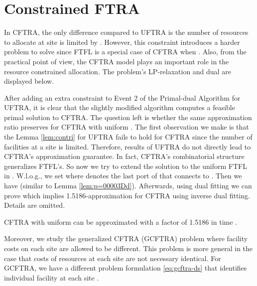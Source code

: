 \documentclass[10pt]{llncs}
\begin{document}
\section{Constrained FTRA }

In CFTRA, the only difference compared to UFTRA is the number of resources
to allocate at site  is limited by  .
However, this constraint introduces a harder problem to solve since
FTFL is a special case of CFTRA when  . Also,
from the practical point of view, the CFTRA model plays an important
role in the resource constrained allocation. The problem's LP-relaxation
and dual are displayed below.

\setlength{\columnsep}{10pt}
\begin{multicols}{2}

{\small 
}{\small \par}

{\small \columnbreak }{\small \par}

{\small 
}{\small \par}

\end{multicols}

After adding an extra constraint  to Event 2 of the
Primal-dual Algorithm for UFTRA, it is clear that the slightly modified
algorithm computes a feasible primal solution to CFTRA. The question
left is whether the same approximation ratio preserves for CFTRA with
uniform . The first observation we make is that the
Lemma \ref{lem:contri} for UFTRA fails to hold for CFTRA since the
number of facilities at a site is limited. Therefore, results of UFTRA
do not directly lead to CFTRA's approximation guarantee. In fact,
CFTRA's combinatorial structure generalizes FTFL's. So now we try
to extend the solution to the uniform FTFL in \cite{Swamy08FTFL2.076}.
W.l.o.g., we set {\small } where  denotes the last port of  that connects to .
Then we have 
(similar to Lemma \ref{lem:p=00003Dd}). Afterwards, using dual fitting
we can prove  
which implies 1.5186-approximation for CFTRA using inverse dual fitting.
Details are omitted. 
\begin{theorem}
CFTRA with uniform  can be approximated with a factor
of 1.5186 in time .
\end{theorem}
Moreover, we study the generalized CFTRA (GCFTRA) problem where facility
costs on each site are allowed to be different. This problem is more
general in the case that costs of resources at each site are not necessary
identical. For GCFTRA, we have a different problem formulation \eqref{eq:gcftra-ds}
that identifies individual facility  at each site . 
\end{document}
